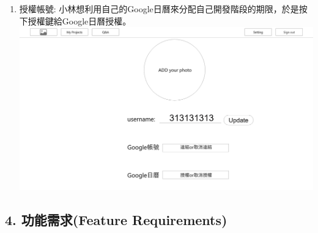 \documentclass{report}
\begin{document}
\begin{enumerate}[label=(\Alph*)]
  \item 授權帳號: 小林想利用自己的Google日曆來分配自己開發階段的期限，於是按下授權鍵給Google日曆授權。\\
  \includegraphics[width=\textwidth]{assets/wireframe/setting.png}
\end{enumerate}

\subsection*{4. 功能需求(Feature Requirements)}               
\end{document}
